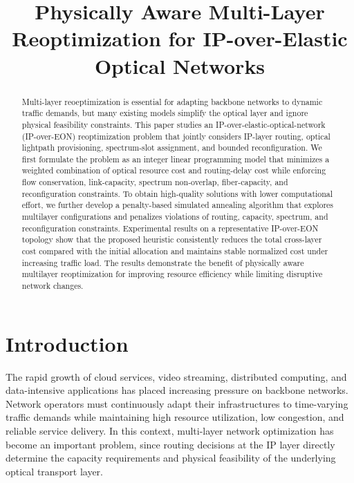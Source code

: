 \documentclass[conference]{IEEEtran}
\begin{document}
\title{Physically Aware Multi-Layer Reoptimization for IP-over-Elastic Optical Networks}

\author{
}

\maketitle

\begin{abstract}
Multi-layer reoeptimization is essential for adapting backbone networks to dynamic traffic demands, but many existing models simplify the optical layer and ignore physical feasibility constraints. This paper studies an IP-over-elastic-optical-network (IP-over-EON) reoptimization problem that jointly considers IP-layer routing, optical lightpath provisioning, spectrum-slot assignment, and bounded reconfiguration. We first formulate the problem as an integer linear programming model that minimizes a weighted combination of optical resource cost and routing-delay cost while enforcing flow conservation, link-capacity, spectrum non-overlap, fiber-capacity, and reconfiguration constraints. To obtain high-quality solutions with lower computational effort, we further develop a penalty-based simulated annealing algorithm that explores multilayer configurations and penalizes violations of routing, capacity, spectrum, and reconfiguration constraints. Experimental results on a representative IP-over-EON topology show that the proposed heuristic consistently reduces the total cross-layer cost compared with the initial allocation and maintains stable normalized cost under increasing traffic load. The results demonstrate the benefit of physically aware multilayer reoptimization for improving resource efficiency while limiting disruptive network changes.
\end{abstract}

\section{Introduction}
\label{sec:introduction}
The rapid growth of cloud services, video streaming, distributed computing, and data-intensive applications has placed increasing pressure on backbone networks. Network operators must continuously adapt their infrastructures to time-varying traffic demands while maintaining high resource utilization, low congestion, and reliable service delivery. In this context, multi-layer network optimization has become an important problem, since routing decisions at the IP layer directly determine the capacity requirements and physical feasibility of the underlying optical transport layer.
\end{document}
